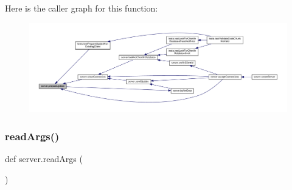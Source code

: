 Here is the caller graph for this function\+:
\nopagebreak
\begin{figure}[H]
\begin{center}
\leavevmode
\includegraphics[width=350pt]{namespaceserver_a4ab7e63c5f934dfea50b006468f9efca_icgraph}
\end{center}
\end{figure}
\mbox{\label{namespaceserver_aa317dc86338d02253076787cc8e5d997}} 
\subsubsection{\texorpdfstring{read\+Args()}{readArgs()}}
{\footnotesize\ttfamily def server.\+read\+Args (\begin{DoxyParamCaption}{ }\end{DoxyParamCaption})}


